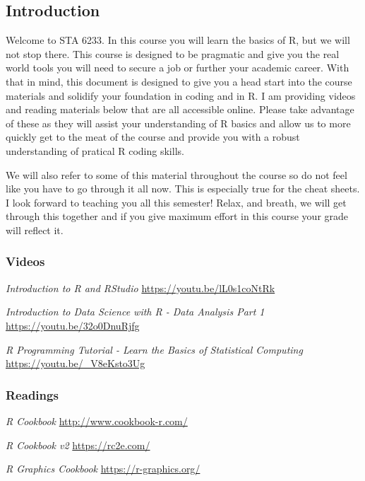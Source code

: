 \documentclass[
]{article}
\author{}
\date{\vspace{-2.5em}}
\begin{document}
\hypertarget{introduction}{%
\subsection{Introduction}\label{introduction}}

Welcome to STA 6233. In this course you will learn the basics of R, but
we will not stop there. This course is designed to be pragmatic and give
you the real world tools you will need to secure a job or further your
academic career. With that in mind, this document is designed to give
you a head start into the course materials and solidify your foundation
in coding and in R. I am providing videos and reading materials below
that are all accessible online. Please take advantage of these as they
will assist your understanding of R basics and allow us to more quickly
get to the meat of the course and provide you with a robust
understanding of pratical R coding skills.

We will also refer to some of this material throughout the course so do
not feel like you have to go through it all now. This is especially true
for the cheat sheets. I look forward to teaching you all this semester!
Relax, and breath, we will get through this together and if you give
maximum effort in this course your grade will reflect it.

\hypertarget{videos}{%
\subsubsection{\texorpdfstring{\textbf{Videos}}{Videos}}\label{videos}}

\emph{Introduction to R and RStudio} \url{https://youtu.be/lL0s1coNtRk}

\emph{Introduction to Data Science with R - Data Analysis Part 1}
\url{https://youtu.be/32o0DnuRjfg}

\emph{R Programming Tutorial - Learn the Basics of Statistical
Computing} \url{https://youtu.be/_V8eKsto3Ug}

\hypertarget{readings}{%
\subsubsection{\texorpdfstring{\textbf{Readings}}{Readings}}\label{readings}}

\emph{R Cookbook} \url{http://www.cookbook-r.com/}

\emph{R Cookbook v2} \url{https://rc2e.com/}

\emph{R Graphics Cookbook} \url{https://r-graphics.org/}
\end{document}
